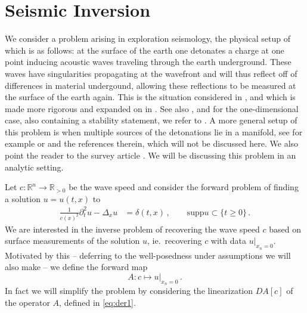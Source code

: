 \documentclass[
	fontsize=11pt, 
	twoside=false, 
	abstract=true, 
	a4paper,
]{scrartcl}
\newcommand{\RR}{\mathbb{R}}
\newcommand{\del}{\partial}
\newcommand{\supp}{\mathrm{supp}}
\begin{document}
\section{Seismic Inversion}\label{sec:seis}

We consider a problem arising in exploration seismology, the physical setup of which is as follows: at the surface of the earth one detonates a charge at one point inducing acoustic waves traveling through the earth underground. These waves have singularities propagating at the wavefront and will thus reflect off of differences in material undergound, allowing these reflections to be measured at the surface of the earth again. This is the situation considered in \cite{zbMATH04097945}, and \cite{zbMATH01725533} which is made more rigorous and expanded on in \cite{zbMATH01725602}. See also \cite{zbMATH00010064,MR776132,zbMATH06005205}, and for the one-dimensional case, also containing a stability statement, we refer to \cite{zbMATH00020888}. A more general setup of this problem is when multiple sources of the detonations lie in a manifold, see for example \cite{zbMATH01044192} or \cite{zbMATH07675878} and the references therein, which will not be discussed here. We also point the reader to the survey article \cite{zbMATH05655830}. We will be discussing this problem in an analytic setting.

Let $c \colon \RR^n \to \RR_{>0}$ be the wave speed and consider the forward problem of finding a solution $u=u(t,x)$ to
\begin{equation}\label{eq:wave}%
\begin{aligned}
	\frac{1}{c(x)^2}\del_t^2 u -\Delta_x u &= \delta(t,x)\,,\qquad \supp u \subset \{t\geq 0\}\,.
	\end{aligned}
\end{equation}
We are interested in the inverse problem of recovering the wave speed $c$ based on surface measurements of the solution $u$, ie.\ recovering $c$ with data $u\vert_{x_n=0}$. 
Motivated by this -- deferring to \cite[\S~1]{zbMATH04097945} the well-posedness under assumptions we will also make -- 
we define the forward map 
\begin{equation}\label{eq:defineA}
	A \colon c \mapsto u\vert_{x_n = 0}\,.
\end{equation}
In fact we will simplify the problem by considering the linearization $DA[c]$ of the operator $A$, defined in \cref{eq:der1}. %
\end{document}
